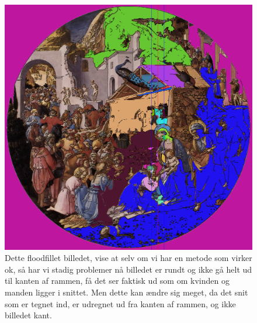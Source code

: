 \begin{figure}[h!!]
	\begin{center}
		\includegraphics[scale=0.3,angle=0]{afsnit/afprovning/billeder/FFadorat.png}
	\end{center}
	\caption[]{Dette floodfillet billedet, vise at selv om vi har en
	           metode som virker ok, så har vi stadig problemer nå
	           billedet er rundt og ikke gå helt ud til kanten af
	           rammen, få det ser faktisk ud som om kvinden og manden
	           ligger i snittet. Men dette kan ændre sig meget, da det
	           snit som er tegnet ind, er udregnet ud fra kanten af
	           rammen, og ikke billedet kant.}
	\label{FFadorat}
\end{figure}

